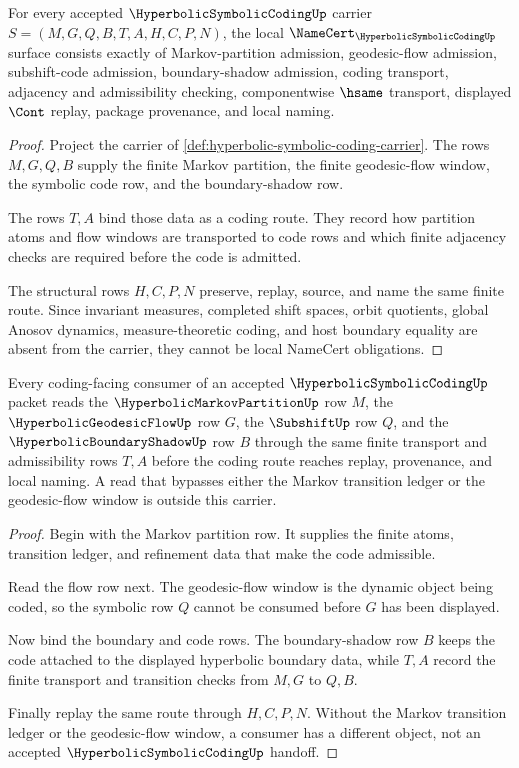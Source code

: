 \begin{theorem}
\label{thm:hyperbolic-symbolic-coding-namecert-obligations}
For every accepted $\HyperbolicSymbolicCodingUp$ carrier $S=(M,G,Q,B,T,A,H,C,P,N)$, the local $\NameCert_{\HyperbolicSymbolicCodingUp}$ surface consists exactly of Markov-partition admission, geodesic-flow admission, subshift-code admission, boundary-shadow admission, coding transport, adjacency and admissibility checking, componentwise $\hsame$ transport, displayed $\Cont$ replay, package provenance, and local naming.
\end{theorem}
\begin{proof}
Project the carrier of \autoref{def:hyperbolic-symbolic-coding-carrier}. The rows $M,G,Q,B$ supply the finite Markov partition, the finite geodesic-flow window, the symbolic code row, and the boundary-shadow row.

The rows $T,A$ bind those data as a coding route. They record how partition atoms and flow windows are transported to code rows and which finite adjacency checks are required before the code is admitted.

The structural rows $H,C,P,N$ preserve, replay, source, and name the same finite route. Since invariant measures, completed shift spaces, orbit quotients, global Anosov dynamics, measure-theoretic coding, and host boundary equality are absent from the carrier, they cannot be local NameCert obligations.
\end{proof}

\begin{theorem}
\label{thm:hyperbolic-symbolic-coding-flow-partition-handoff}
Every coding-facing consumer of an accepted $\HyperbolicSymbolicCodingUp$ packet reads the $\HyperbolicMarkovPartitionUp$ row $M$, the $\HyperbolicGeodesicFlowUp$ row $G$, the $\SubshiftUp$ row $Q$, and the $\HyperbolicBoundaryShadowUp$ row $B$ through the same finite transport and admissibility rows $T,A$ before the coding route reaches replay, provenance, and local naming. A read that bypasses either the Markov transition ledger or the geodesic-flow window is outside this carrier.
\end{theorem}
\begin{proof}
Begin with the Markov partition row. It supplies the finite atoms, transition ledger, and refinement data that make the code admissible.

Read the flow row next. The geodesic-flow window is the dynamic object being coded, so the symbolic row $Q$ cannot be consumed before $G$ has been displayed.

Now bind the boundary and code rows. The boundary-shadow row $B$ keeps the code attached to the displayed hyperbolic boundary data, while $T,A$ record the finite transport and transition checks from $M,G$ to $Q,B$.

Finally replay the same route through $H,C,P,N$. Without the Markov transition ledger or the geodesic-flow window, a consumer has a different object, not an accepted $\HyperbolicSymbolicCodingUp$ handoff.
\end{proof}

